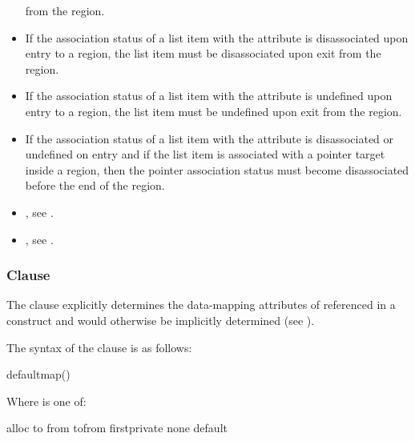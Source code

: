 \begin{fortranspecific}
\begin{itemize}
      from the region.
\item If the association status of a list item with the 
      attribute is disassociated upon entry to a  region, the
      list item must be disassociated upon exit from the region.
\item If the association status of a list item with the 
      attribute is undefined upon entry to a  region, the
      list item must be undefined upon exit from the region.
\item If the association status of a list item with the 
      attribute is disassociated or undefined on entry and if the list
      item is associated with a pointer target inside a 
      region, then the pointer association status must become
      disassociated before the end of the region.
\end{itemize}
\end{fortranspecific}

\crossreferences
\begin{itemize}
\item {}, see
.

\item {}, see
.
\end{itemize}



\subsubsection{ Clause}
\label{subsubsec:defaultmap clause}

\summary

The  clause explicitly determines the data-mapping attributes of 
referenced in a  construct and would otherwise be implicitly determined 
(see ).

\syntax
The syntax of the  clause is as follows:

\begin{ompSyntax}
  defaultmap()
\end{ompSyntax}

Where  is one of:
\begin{indentedcodelist}
  alloc
  to
  from
  tofrom
  firstprivate
  none
  default
\end{indentedcodelist}

